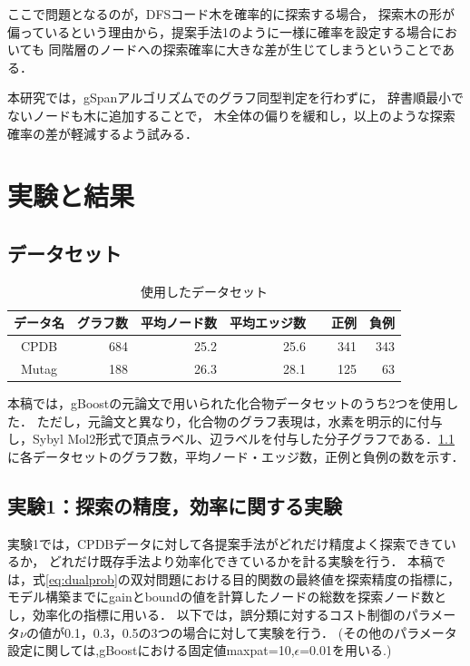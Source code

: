 ここで問題となるのが，DFSコード木を確率的に探索する場合，
探索木の形が偏っているという理由から，提案手法1のように一様に確率を設定する場合においても
同階層のノードへの探索確率に大きな差が生じてしまうということである．

本研究では，gSpanアルゴリズムでのグラフ同型判定を行わずに，
辞書順最小でないノードも木に追加することで，
木全体の偏りを緩和し，以上のような探索確率の差が軽減するよう試みる．

\chapter{実験と結果}
\section{データセット}
\begin{table}
	\centering
	\begin{tabular}{|c|r|r|r|r|r|}
		\hline
		データ名 & グラフ数 & 平均ノード数 & 平均エッジ数 & 正例　& 負例\\
		\hline \hline
		CPDB  & 684 & 25.2 & 25.6 & 341 & 343\\
		\hline
		Mutag & 188 & 26.3 & 28.1 & 125 & 63\\
		\hline
	\end{tabular}
	\caption{使用したデータセット}
	\label{dataset}
\end{table}

本稿では，gBoostの元論文\cite{gBoost}で用いられた化合物データセットのうち2つを使用した．
ただし，元論文\cite{gBoost}と異なり，化合物のグラフ表現は，水素を明示的に付与し，Sybyl Mol2形式で頂点ラベル、辺ラベルを付与した分子グラフである．\ref{dataset}に各データセットのグラフ数，平均ノード・エッジ数，正例と負例の数を示す．

\section{実験1：探索の精度，効率に関する実験}
実験1では，CPDBデータに対して各提案手法がどれだけ精度よく探索できているか，
どれだけ既存手法より効率化できているかを計る実験を行う．
本稿では，式\eqref{eq:dualprob}の双対問題における目的関数の最終値を探索精度の指標に，
モデル構築までにgainとboundの値を計算したノードの総数を探索ノード数とし，効率化の指標に用いる．
以下では，誤分類に対するコスト制御のパラメータ$\nu$の値が0.1，0.3，0.5の3つの場合に対して実験を行う．
(その他のパラメータ設定に関しては,gBoostにおける固定値maxpat=10,$\epsilon$=0.01を用いる.)


